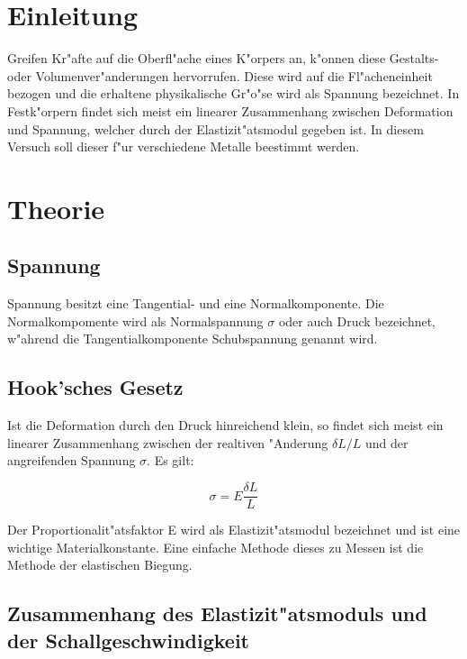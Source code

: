 \section{Einleitung}
\label{sec:einleitung}

Greifen Kr"afte auf die Oberfl"ache eines K"orpers
an, k"onnen diese Gestalts- oder Volumenver"anderungen hervorrufen. Diese wird auf die Fl"acheneinheit bezogen und die erhaltene physikalische Gr"o"se wird als Spannung bezeichnet.
In Festk"orpern findet sich meist ein linearer Zusammenhang zwischen Deformation und Spannung, welcher durch der Elastizit"atsmodul gegeben ist. In diesem Versuch soll dieser f"ur verschiedene Metalle beestimmt werden.

\section{Theorie}
\label{sec:theorie}

\subsection{Spannung} %
\label{sub:spannung}

Spannung besitzt eine Tangential- und eine Normalkomponente. Die Normalkompomente wird als Normalspannung $\sigma$ oder auch Druck bezeichnet, w"ahrend die Tangentialkomponente Schubspannung genannt wird.

\subsection{Hook'sches Gesetz} %
\label{sub:hook_sches_gesetz}

Ist die Deformation durch den Druck hinreichend klein, so findet sich meist ein linearer Zusammenhang zwischen der realtiven "Anderung $\delta L/L$ und der angreifenden Spannung $\sigma$. Es gilt:

\begin{equation}
\sigma = E \frac{\delta L}{L}
\end{equation}

Der Proportionalit"atsfaktor E wird als Elastizit"atsmodul bezeichnet und ist eine wichtige Materialkonstante.
Eine einfache Methode dieses zu Messen ist die Methode der elastischen Biegung.

\subsection{Zusammenhang des Elastizit"atsmoduls und der Schallgeschwindigkeit} %
\label{sub:der_elastizit_atsmodul}

